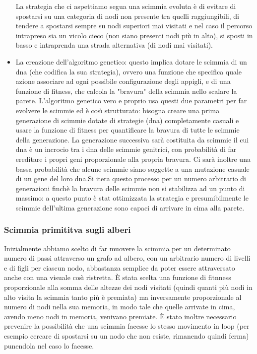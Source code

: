 \documentclass{article}
\begin{document}
\begin{itemize}
La strategia che ci aspettiamo segua una scimmia evoluta \`{e} di evitare di spostarsi su una categoria di nodi non presente tra quelli raggiungibili, di tendere a spostarsi sempre su nodi superiori mai visitati e nel caso il percorso intrapreso sia un vicolo cieco (non siano presenti nodi pi\`{u} in alto), si sposti in basso e intraprenda una strada alternativa (di nodi mai visitati).


 \item La creazione dell'algoritmo genetico: questo implica dotare le scimmia di un dna (che codifica la sua strategia), ovvero una funzione che specifica quale azione associare ad ogni possibile configurazione degli appigli, e di una funzione di fitness, che calcola la "bravura" della scimmia nello scalare la parete. L'algoritmo genetico vero e proprio usa questi due parametri per far evolvere le scimmie ed \`{e} cos\`{\i} strutturato: bisogna creare una prima generazione di scimmie dotate di strategie (dna) completamente casuali e usare la funzione di fitness per quantificare la bravura di tutte le scimmie della generazione. La generazione successiva sar\`{a} costituita da scimmie il cui dna \`{e} un incrocio tra i dna delle scimmie genitrici, con probabilit\`{a} di far ereditare i propri geni proporzionale alla propria bravura. Ci sar\`{a} inoltre una bassa probabilit\`{a} che alcune scimmie siano soggette a una mutazione casuale di un gene del loro dna.Si itera questo processo per un numero arbitrario di generazioni finch\`{e} la bravura delle scimmie non si stabilizza ad un punto di massimo: a questo punto \`{e} stat ottimizzata la strategia e presumibilmente le scimmie dell'ultima generazione sono capaci di arrivare in cima alla parete.
\end{itemize}


\subsubsection{Scimmia primititva sugli alberi}
Inizialmente abbiamo scelto di far muovere la scimmia per un determinato numero di passi attraverso un grafo ad albero, con un arbitrario numero di livelli e di figli per ciascun nodo, abbastanza semplice da poter essere attraversato anche con una visuale cos\`{\i} ristretta. \`{E} stata scelta una funzione di fitnness proporzionale alla somma delle altezze dei nodi visitati (quindi quanti pi\`{u} nodi in alto visita la scimmia tanto pi\`{u} \`{e} premiata) ma inversamente proporzionale al numero di nodi nella sua memoria, in modo tale che quelle arrivate in cima, avendo meno nodi in memoria, venivano premiate. \`{E} stato inoltre necessario prevenire la possibilit\`{a} che una scimmia facesse lo stesso movimento in loop (per esempio cercare di spostarsi su un nodo che non esiste, rimanendo quindi ferma) punendola nel caso lo facesse.
\end{document}
